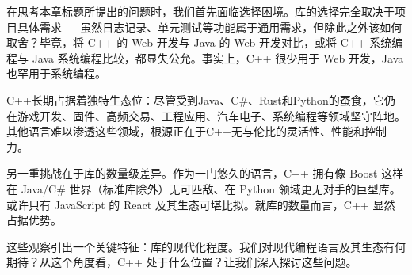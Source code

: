 在思考本章标题所提出的问题时，我们首先面临选择困境。库的选择完全取决于项目具体需求 --- 虽然日志记录、单元测试等功能属于通用需求，但除此之外该如何取舍？毕竟，将 C++ 的 Web 开发与 Java 的 Web 开发对比，或将 C++ 系统编程与 Java 系统编程比较，都显失公允。事实上，C++ 很少用于 Web 开发，Java 也罕用于系统编程。

C++长期占据着独特生态位：尽管受到Java、C\#、Rust和Python的蚕食，它仍在游戏开发、固件、高频交易、工程应用、汽车电子、系统编程等领域坚守阵地。其他语言难以渗透这些领域，根源正在于C++无与伦比的灵活性、性能和控制力。

另一重挑战在于库的数量级差异。作为一门悠久的语言，C++ 拥有像 Boost 这样在 Java/C\# 世界（标准库除外）无可匹敌、在 Python 领域更无对手的巨型库。或许只有 JavaScript 的 React 及其生态可堪比拟。就库的数量而言，C++ 显然占据优势。

这些观察引出一个关键特征：库的现代化程度。我们对现代编程语言及其生态有何期待？从这个角度看，C++ 处于什么位置？让我们深入探讨这些问题。